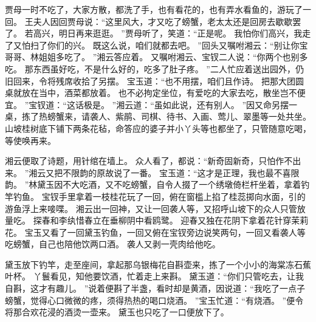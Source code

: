 贾母一时不吃了，大家方散，都洗了手，也有看花的，也有弄水看鱼的，游玩了一回。
王夫人因回贾母说：“这里风大，才又吃了螃蟹，老太太还是回房去歇歇罢了。
若高兴，明日再来逛逛。
”贾母听了，笑道：“正是呢。
我怕你们高兴，我走了又怕扫了你们的兴。
既这么说，咱们就都去吧。
”回头又嘱咐湘云：“别让你宝哥哥、林姐姐多吃了。
”湘云答应着。
又嘱咐湘云、宝钗二人说：“你两个也别多吃。
那东西虽好吃，不是什么好的，吃多了肚子疼。
”二人忙应着送出园外，仍旧回来，令将残席收拾了另摆。
宝玉道：“也不用摆，咱们且作诗。
把那大团圆桌就放在当中，酒菜都放着。
也不必拘定坐位，有爱吃的大家去吃，散坐岂不便宜。
”宝钗道：“这话极是。
”湘云道：“虽如此说，还有别人。
”因又命另摆一桌，拣了热螃蟹来，请袭人、紫鹃、司棋、待书、入画、莺儿、翠墨等一处共坐。
山坡桂树底下铺下两条花毡，命答应的婆子并小丫头等也都坐了，只管随意吃喝，等使唤再来。
\par
湘云便取了诗题，用针绾在墙上。
众人看了，都说：“新奇固新奇，只怕作不出来。
”湘云又把不限韵的原故说了一番。
宝玉道：“这才是正理，我也最不喜限韵。
”林黛玉因不大吃酒，又不吃螃蟹，自令人掇了一个绣墩倚栏杆坐着，拿着钓竿钓鱼。
宝钗手里拿着一枝桂花玩了一回，俯在窗槛上掐了桂蕊掷向水面，引的游鱼浮上来唼喋。
湘云出一回神，又让一回袭人等，又招呼山坡下的众人只管放量吃。
探春和李纨惜春立在垂柳阴中看鸥鹭。
迎春又独在花阴下拿着花针穿茉莉花。
宝玉又看了一回黛玉钓鱼，一回又俯在宝钗旁边说笑两句，一回又看袭人等吃螃蟹，自己也陪他饮两口酒。
袭人又剥一壳肉给他吃。
\par
黛玉放下钓竿，走至座间，拿起那乌银梅花自斟壶来，拣了一个小小的海棠冻石蕉叶杯。
丫鬟看见，知他要饮酒，忙着走上来斟。
黛玉道：“你们只管吃去，让我自斟，这才有趣儿。
”说着便斟了半盏，看时却是黄酒，因说道：“我吃了一点子螃蟹，觉得心口微微的疼，须得热热的喝口烧酒。
”宝玉忙道：“有烧酒。
”便令将那合欢花浸的酒烫一壶来。
黛玉也只吃了一口便放下了。
